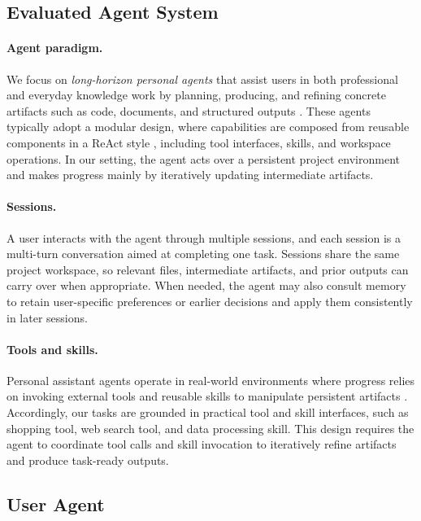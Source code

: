 \documentclass{llmxive}
\begin{document}
\subsection{Evaluated Agent System}
\label{sec:evaluated_agent_system}

\paragraph{Agent paradigm.}
We focus on \emph{long-horizon personal agents} that assist users in both professional and everyday knowledge work by planning, producing, and refining concrete artifacts such as code, documents, and structured outputs \citep{openclaw,zhang2026clawbench,li2026clawsbench}. These agents typically adopt a modular design, where capabilities are composed from reusable components in a ReAct style \citep{yao2022react}, including tool interfaces, skills, and workspace operations. In our setting, the agent acts over a persistent project environment and makes progress mainly by iteratively updating intermediate artifacts.

\paragraph{Sessions.}
A user interacts with the agent through multiple {sessions}, and each session is a multi-turn conversation aimed at completing one task. Sessions share the same project workspace, so relevant files, intermediate artifacts, and prior outputs can carry over when appropriate. When needed, the agent may also consult memory to retain user-specific preferences or earlier decisions and apply them consistently in later sessions.

\paragraph{Tools and skills.}
Personal assistant agents operate in real-world environments where progress relies on invoking external tools and reusable skills to manipulate persistent artifacts \citep{schick2023toolformer,yao2024tau,patil2024gorilla,wang2026skillx}.
Accordingly, our tasks are grounded in practical tool and skill interfaces, such as shopping tool, web search tool, and data processing skill. This design requires the agent to coordinate tool calls and skill invocation to iteratively refine artifacts and produce task-ready outputs.

\subsection{User Agent}
\label{sec:user_agent}
\end{document}

